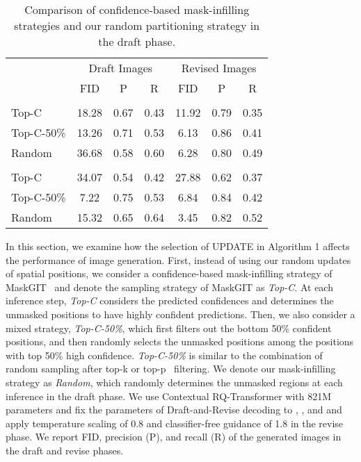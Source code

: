 \documentclass{article}
\begin{document}
\begin{table}[t] \small
\centering\caption{Comparison of confidence-based mask-infilling strategies and our random partitioning strategy in the draft phase.}
\label{tab:conf_vs_rand}
\begin{tabular}{l|ccc|ccc}
\toprule
& \multicolumn{3}{c|}{Draft Images} & \multicolumn{3}{c}{Revised Images} \\ \cline{2-7}
  & FID & P & R & FID & P & R \\ \hline
 \rowcolor[gray]{0.95}\multicolumn{7}{c}{} \\ \hline
 Top-C & 18.28 & 0.67 & 0.43 & 11.92 & 0.79 & 0.35 \\ 
 Top-C-50\% & 13.26 & 0.71 & 0.53 & 6.13 & 0.86 & 0.41 \\
 Random & 36.68 & 0.58 & 0.60 & 6.28 & 0.80 & 0.49 \\ \hline
 \rowcolor[gray]{0.95}\multicolumn{7}{c}{} \\ \hline
 Top-C & 34.07 & 0.54 & 0.42 & 27.88 & 0.62 & 0.37 \\
 Top-C-50\% & 7.22 & 0.75 & 0.53 & 6.84 & 0.84 & 0.42 \\
 Random & 15.32 & 0.65 & 0.64 & 3.45 & 0.82 & 0.52 \\ 
\bottomrule
\end{tabular}
\end{table} 

In this section, we examine how the selection of \textrm{UPDATE} in Algorithm 1 affects the performance of image generation.
First, instead of using our random updates of spatial positions, we consider a confidence-based mask-infilling strategy of MaskGIT~\cite{MaskGIT} and denote the sampling strategy of MaskGIT as \emph{Top-C}.
At each inference step, \emph{Top-C} considers the predicted confidences and determines the unmasked positions to have highly confident predictions.
Then, we also consider a mixed strategy, \emph{Top-C-50\%}, which first filters out the bottom 50\% confident positions, and then randomly selects the unmasked positions among the positions with top 50\% high confidence.
\emph{Top-C-50\%} is similar to the combination of random sampling after top-k or top-p~\cite{topKP} filtering.
We denote our mask-infilling strategy as \emph{Random}, which randomly determines the unmasked regions at each inference in the draft phase.
We use Contextual RQ-Transformer with 821M parameters and fix the parameters of Draft-and-Revise decoding to , , and  and apply temperature scaling of 0.8 and classifier-free guidance of 1.8 in the revise phase. We report FID, precision (P), and recall (R) of the generated images in the draft and revise phases.
\end{document}
